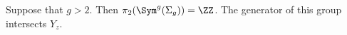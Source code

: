 

    Suppose that $g>2$. Then $\pi_2(\Sym^g(\Sigma_g))=\ZZ$. The generator of this group intersects $Y_z$.

